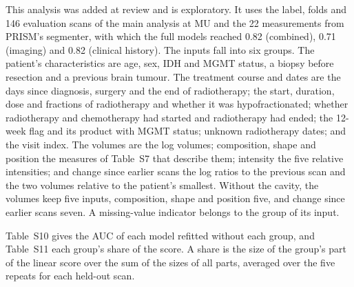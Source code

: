 \documentclass[11pt,a4paper]{article}
\begin{document}
This analysis was added at review and is exploratory. It uses the label, folds and 146 evaluation scans of the main
analysis at MU and the 22 measurements from PRISM's segmenter, with which the full models reached 0.82 (combined),
0.71 (imaging) and 0.82 (clinical history). The inputs
fall into six groups. The patient's characteristics are age, sex, IDH and MGMT status, a biopsy before resection and a
previous brain tumour. The treatment course and dates are the days since diagnosis, surgery and the end of
radiotherapy; the start, duration, dose and fractions of radiotherapy and whether it was hypofractionated; whether
radiotherapy and chemotherapy had started and radiotherapy had ended; the 12-week flag and its product with MGMT
status; unknown radiotherapy dates; and the visit index. The volumes are the log volumes; composition, shape and
position the measures of Table~S7 that describe them; intensity the five relative intensities; and change since
earlier scans the log ratios to the previous scan and the two volumes relative to the patient's smallest. Without the
cavity, the volumes keep five inputs, composition, shape and position five, and change since earlier scans seven. A
missing-value indicator belongs to the group of its input.

Table~S10 gives the AUC of each model refitted without each group, and Table~S11 each group's share of the score. A
share is the size of the group's part of the linear score over the sum of the sizes of all parts, averaged over the
five repeats for each held-out scan.
\end{document}
